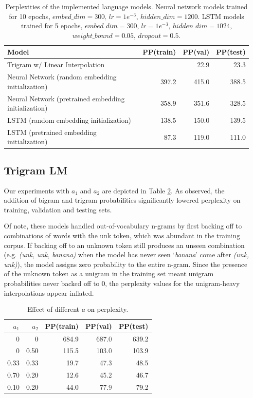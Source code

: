 \documentclass[11pt]{article}
\begin{document}
\begin{table}[h]
  \centering
  \begin{tabular}{@{}lrrr@{}}
  \toprule
  \textbf{Model} & \textbf{PP(train)} & \textbf{PP(val)} & \textbf{PP(test)} \\ \midrule
  Trigram w/ Linear Interpolation & & 22.9 & 23.3 \\
  Neural Network (random embedding initialization) & 397.2 & 415.0 & 388.5 \\ 
  Neural Network (pretrained embedding initialization) & 358.9 & 351.6 & 328.5 \\ 
  LSTM (random embedding initialization) & 138.5 & 150.0 & 139.5 \\ 
  LSTM (pretrained embedding initialization) & 87.3 & 119.0 & 111.0 \\ 
  \bottomrule
  \end{tabular}
  \caption{Perplexities of the implemented language models. Neural network models trained for 10 epochs, $embed\_dim=300$, $lr=1e^{-3}$, $hidden\_dim=1200$. LSTM models trained for 5 epochs, $embed\_dim=300$, $lr=1e^{-3}$, $hidden\_dim=1024$, $weight\_bound=0.05$, $dropout=0.5$.}
  \label{tab:perplexities}
\end{table}

\subsection{Trigram LM}

Our experiments with $a_1$ and $a_2$ are depicted in Table \ref{tab:a-pps}. As observed, the addition of bigram and trigram probabilities significantly lowered perplexity on training, validation and testing sets. 

Of note, these models handled out-of-vocabulary n-grams by first backing off to combinations of words with the unk token, which was abundant in the training corpus. If backing off to an unknown token still produces an unseen combination (e.g. \textit{(unk, unk, banana)} when the model has never seen `\textit{banana}' come after \textit{(unk, unk)}), the model assigns zero probability to the entire n-gram. Since the presence of the unknown token as a unigram in the training set meant unigram probabilities never backed off to 0, the perplexity values for the unigram-heavy interpolations appear inflated.

\begin{table}[h]
  \centering
  \begin{tabular}{@{}rrrrr@{}}
  \toprule
  \textbf{$a_1$} & \textbf{$a_2$} & \textbf{PP(train)} & \textbf{PP(val)} & \textbf{PP(test)} \\ \midrule
  0 & 0 & 684.9 & 687.0 & 639.2 \\
  0 & 0.50 & 115.5 & 103.0 & 103.9 \\
  0.33 & 0.33 & 19.7 & 47.3 & 48.5 \\
  0.70 & 0.20 & 12.6 & 45.2 & 46.7 \\
  0.10 & 0.20 & 44.0 & 77.9 & 79.2 \\
  \bottomrule
  \end{tabular}
  \caption{Effect of different $a$ on perplexity.}
  \label{tab:a-pps}
\end{table}
\end{document}
